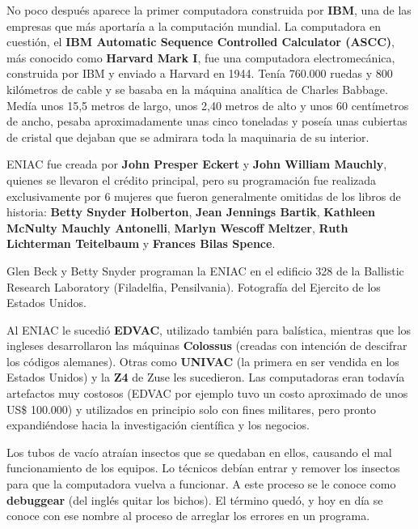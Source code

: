 No poco después aparece la primer computadora construida por \textbf{IBM},
una de las empresas que más aportaría a la computación mundial. La computadora
en cuestión, el \textbf{IBM Automatic Sequence Controlled Calculator (ASCC)},
más conocido como \textbf{Harvard Mark I}, fue una computadora electromecánica,
construida por IBM y enviado a Harvard en 1944. Tenía 760.000 ruedas y 800
kilómetros de cable y se basaba en la máquina analítica de Charles Babbage.
Medía unos 15,5 metros de largo, unos 2,40 metros de alto y unos 60 centímetros
de ancho, pesaba aproximadamente unas cinco toneladas y poseía unas cubiertas de
cristal que dejaban que se admirara toda la maquinaria de su interior.
\autocite[p. 32]{ceruzzi_2012}

\begin{knowwhat}
    ENIAC fue creada por \textbf{John Presper Eckert} y \textbf{John William Mauchly},
    quienes se llevaron el crédito principal, pero su programación fue realizada
    exclusivamente por 6 mujeres que fueron generalmente omitidas de los libros de
    historia: \textbf{Betty Snyder Holberton}, \textbf{Jean Jennings Bartik},
    \textbf{Kathleen McNulty Mauchly Antonelli}, \textbf{Marlyn Wescoff Meltzer},
    \textbf{Ruth Lichterman Teitelbaum} y \textbf{Frances Bilas Spence}.
\end{knowwhat}

{Glen Beck y Betty Snyder programan la ENIAC en el edificio 328 de
la Ballistic Research Laboratory (Filadelfia, Pensilvania).}
{Fotografía del Ejercito de los Estados Unidos.}

Al ENIAC le sucedió \textbf{EDVAC}, utilizado también para balística, mientras
que los ingleses desarrollaron las máquinas \textbf{Colossus} (creadas con
intención de descifrar los códigos alemanes). Otras como \textbf{UNIVAC}
(la primera en ser vendida en los Estados Unidos) y la \textbf{Z4} de Zuse
les sucedieron. Las computadoras eran todavía artefactos muy costosos
(EDVAC por ejemplo tuvo un costo aproximado de unos US\$ 100.000) y utilizados
en principio solo con fines militares, pero pronto expandiéndose hacia la
investigación científica y los negocios.

\begin{knowwhat}
    Los tubos de vacío atraían insectos que se quedaban en ellos, causando el mal
    funcionamiento de los equipos. Lo técnicos debían entrar y remover los insectos
    para que la computadora vuelva a funcionar. A este proceso se le conoce como
    \textbf{debuggear} (del inglés quitar los bichos). El término quedó, y hoy en
    día se conoce con ese nombre al proceso de arreglar los errores en un programa.
\end{knowwhat}

